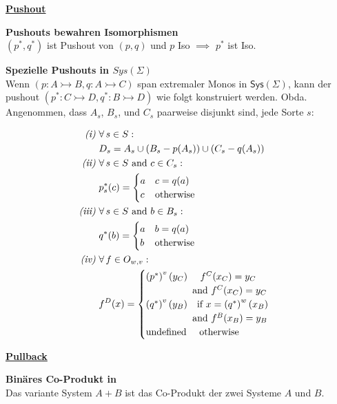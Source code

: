\begin{multicols}{2}

\textbf{\underline{Pushout}} 

\textbf{ Pushouts bewahren Isomorphismen} \\
$(p^*, q^*)$ ist Pushout von $(p,q)$ und $p$ Iso $\implies$ $p^*$ ist Iso.

\textbf{ Spezielle Pushouts in $Sys(\Sigma)$} \\
Wenn $(p:A\rightarrowtail B,q:A\rightarrowtail C)$ span extremaler Monos  in $\mathsf{Sys}(\Sigma)$, kann der pushout $(p^{*}:C\rightarrowtail D,q^{*}:B\rightarrowtail D)$
wie folgt konstruiert werden. Obda. Angenommen, dass $A_{s}$, $B_{s}$, und $C_{s}$ paarweise disjunkt sind, jede Sorte  $s$:

\begin{align*}
\textrm{\emph{(i)} } & \forall \, s\in S: \\ & D_{s}=A_{s}\cup\left(B_{s}-p(A_{s})\right)\cup\left(C_{s}-q(A_{s})\right)\\
\textrm{\emph{(ii)} } & \forall \, s \in S\textrm{ and }c\in C_{s}: \\ &  p_{s}^{*}(c)=\begin{cases}
a & c=q(a)\\
c & \textrm{otherwise} 
\end{cases}\\
\textrm{\emph{(iii)} } &  \forall \, s\in S\textrm{ and }b\in B_{s}: \\ & q^{*}(b)=\begin{cases}
a & b=q(a)\\
b & \textrm{otherwise}
\end{cases}\\
\textrm{\emph{(iv)} } &  \forall \, f \in O_{w,v}:\\ & f^{D}(x)=\begin{cases}
\left(p^{*}\right)^{v}(y_{C}) \, \, \, \, \, \,  \, \,  f^{C}(x_{C})=y_{C}\\
\, \, \, \, \, \,  \, \, \, \, \, \, \, \,  \, \, \, \, \, \, \, \,  \, \, \, \, \,  \textrm{ and }f^{C}(x_{C})=y_{C}\\
\left(q^{*}\right)^{v}(y_{B}) \, \, \, \, \, \,    \textrm{if }x=\left(q^{*}\right)^{w}(x_{B})\\
\, \, \, \, \, \,  \, \, \, \, \, \, \, \,  \, \, \, \, \, \, \, \,  \, \, \, \, \, \textrm{ and }f^{B}(x_{B})=y_{B}\\
\textrm{undefined} \, \, \, \, \, \,  \, \,  \textrm{otherwise}
\end{cases}
\end{align*}



\columnbreak

\textbf{\underline{Pullback}} 

\textbf{ Binäres Co-Produkt in \syssig} \\
Das variante System $A + B$ ist das Co-Produkt der zwei Systeme $A$ und $B$.

\end{multicols}




